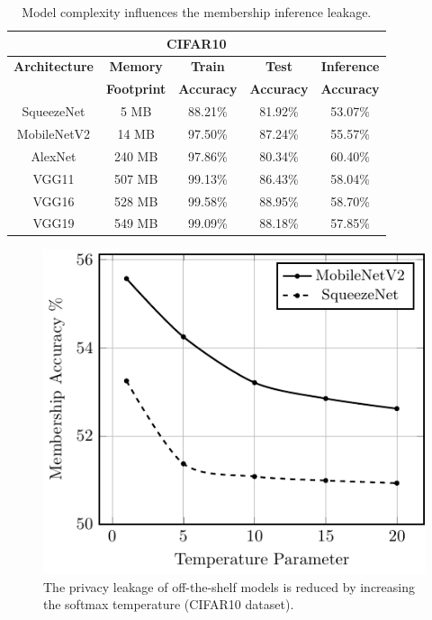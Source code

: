 \begin{table}[h]
\begin{center}
\renewcommand\arraystretch{1.5}
\fontsize{6.5pt}{6.5pt}\selectfont
\begin{tabular}{|c|c|c|c|c|}
\hline
\multicolumn{5}{|c|}{\textbf{CIFAR10}}\\
\hline
\textbf{Architecture} & \textbf{Memory} & \textbf{Train}  & \textbf{Test}  & \textbf{Inference}   \\
 & \textbf{Footprint} & \textbf{Accuracy} & \textbf{Accuracy} & \textbf{Accuracy}  \\
\hline
SqueezeNet & 5 MB & 88.21\% & 81.92\% & \cellcolor{green!25}53.07\% \\
MobileNetV2 & 14 MB & 97.50\% & 87.24\% & \cellcolor{green!25}55.57\% \\
\hline
AlexNet & 240 MB & 97.86\% & 80.34\% & \cellcolor{red!25}60.40\% \\
VGG11 & 507 MB & 99.13\% & 86.43\% & \cellcolor{red!25}58.04\% \\
VGG16 & 528 MB & 99.58\% & 88.95\% & \cellcolor{red!25}58.70\%  \\
VGG19 & 549 MB & 99.09\% & 88.18\% & \cellcolor{red!25}57.85\% \\
\hline
\end{tabular}
\end{center}
\caption{Model complexity influences the membership inference leakage.}
\label{stdarch}
\vspace{-4mm}
\end{table}


\begin{figure}
  \includegraphics[width=0.6\columnwidth]{figures/efficientArch.pdf}
  \caption{The privacy leakage of off-the-shelf models is reduced by increasing the softmax temperature (CIFAR10 dataset).}
  \label{softmax}
\vspace{-2mm}
\end{figure}

